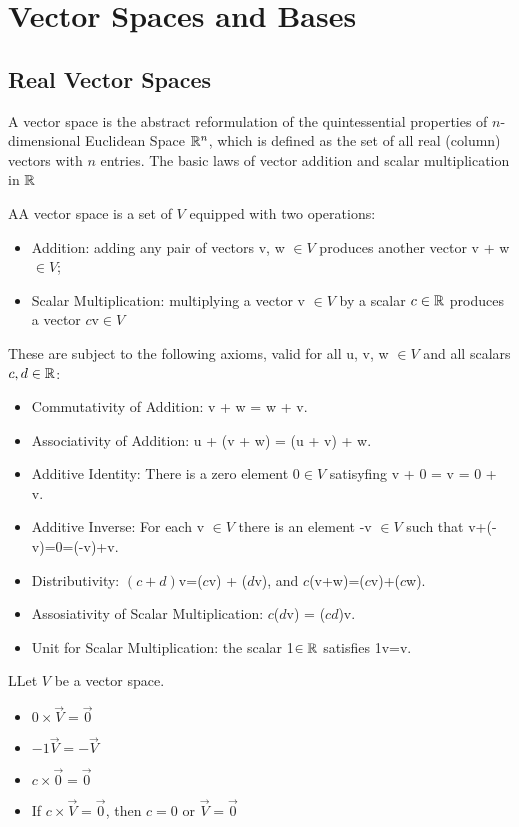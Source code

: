 \section{Vector Spaces and Bases}

\subsection{Real Vector Spaces}
  A vector space is the abstract reformulation of the quintessential properties of $n$-dimensional Euclidean Space $\mathbb{R}^n$, which is defined as the set of all real (column) vectors with $n$ entries. The basic laws of vector addition and scalar multiplication in $\mathbb{R}$

  \begin{definition}
    AA vector space is a set of $V$ equipped with two operations:
    \begin{itemize}
      \item Addition: adding any pair of vectors v, w $\in V$ produces another vector v + w $\in V$;
      \item Scalar Multiplication: multiplying a vector v $\in V$ by a scalar $c\in\mathbb{R}$ produces a vector $c$v$\in V$
    \end{itemize}

    These are subject to the following axioms, valid for all u, v, w $\in V$ and all scalars $c,d\in\mathbb{R}$:
    \begin{itemize}
      \item Commutativity of Addition: v + w = w + v.
      \item Associativity of Addition: u + (v + w) = (u + v) + w.
      \item Additive Identity: There is a zero element $0\in V$ satisyfing v + 0 = v = 0 + v.
      \item Additive Inverse: For each v $\in V$ there is an element -v $\in V$ such that v+(-v)=0=(-v)+v.
      \item Distributivity: $(c+d)$v=($c$v) + ($d$v), and $c$(v+w)=($c$v)+($c$w).
      \item Assosiativity of Scalar Multiplication: $c$($d$v) = ($cd$)v.
      \item Unit for Scalar Multiplication: the scalar 1$\in\mathbb{R}$ satisfies 1v=v.
    \end{itemize}
  \end{definition}

  \begin{theorem}
    LLet $V$ be a vector space.
    \begin{itemize}
      \item $0\times\vec{V}=\vec{0}$
      \item $-1\vec{V}=-\vec{V}$
      \item $c\times\vec{0}=\vec{0}$
      \item If $c\times\vec{V}=\vec{0}$, then $c=0$ or $\vec{V}=\vec{0}$
    \end{itemize}
  \end{theorem}
  
